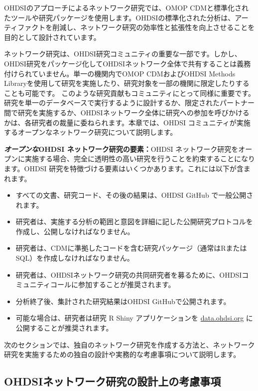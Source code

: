 \documentclass[
  11pt]{book}
\theoremstyle{definition}
\theoremstyle{definition}
\theoremstyle{definition}
\theoremstyle{definition}
\theoremstyle{remark}
\begin{document}
OHDSIのアプローチによるネットワーク研究では、OMOP CDMと標準化されたツールや研究パッケージを使用します。OHDSIの標準化された分析は、アーティファクトを削減し、ネットワーク研究の効率性と拡張性を向上させることを目的として設計されています。

ネットワーク研究は、OHDSI研究コミュニティの重要な一部です。しかし、OHDSI研究をパッケージ化してOHDSIネットワーク全体で共有することは義務付けられていません。単一の機関内でOMOP CDMおよびOHDSI Methods Libraryを使用して研究を実施したり、研究対象を一部の機関に限定したりすることも可能です。 このような研究貢献もコミュニティにとって同様に重要です。 研究を単一のデータベースで実行するように設計するか、限定されたパートナー間で研究を実施するか、OHDSIネットワーク全体に研究への参加を呼びかけるかは、各研究者の裁量に委ねられます。本章では、OHDSI コミュニティが実施するオープンなネットワーク研究について説明します。

\textbf{\emph{オープンな}OHDSI ネットワーク研究の要素：}OHDSI ネットワーク研究をオープンに実施する場合、完全に透明性の高い研究を行うことを約束することになります。OHDSI 研究を特徴づける要素はいくつかあります。これには以下が含まれます。

\begin{itemize}
\item
  すべての文書、研究コード、その後の結果は、OHDSI GitHub で一般公開されます。
\item
  研究者は、実施する分析の範囲と意図を詳細に記した公開研究プロトコルを作成し、公開しなければなりません。
\item
  研究者は、CDMに準拠したコードを含む研究パッケージ（通常はRまたはSQL）を作成しなければなりません。
\item
  研究者は、OHDSIネットワーク研究の共同研究者を募るために、OHDSIコミュニティコールに参加することが推奨されます。
\item
  分析終了後、集計された研究結果はOHDSI GitHubで公開されます。
\item
  可能な場合は、研究者は研究 R Shiny アプリケーションを \href{http://data.ohdsi.org/}{data.ohdsi.org} に公開することが推奨されます。
\end{itemize}

次のセクションでは、独自のネットワーク研究を作成する方法と、ネットワーク研究を実施するための独自の設計や実務的な考慮事項について説明します。

\subsection{OHDSIネットワーク研究の設計上の考慮事項}\label{ohdsiux30cdux30c3ux30c8ux30efux30fcux30afux7814ux7a76ux306eux8a2dux8a08ux4e0aux306eux8003ux616eux4e8bux9805}
\end{document}

